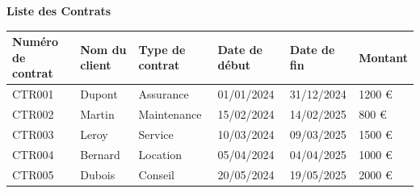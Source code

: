 \documentclass{article}
\begin{document}
\begin{center}
\end{center}

\begin{center}
    \Large\textbf{Liste des Contrats}
\end{center}

\bigskip

\noindent
\begin{tabularx}{\textwidth}{|l|l|l|l|l|X|}
    \hline
    \textbf{Numéro de contrat} & \textbf{Nom du client} & \textbf{Type de contrat} & \textbf{Date de début} & \textbf{Date de fin} & \textbf{Montant} \\
    \hline
    CTR001 & Dupont & Assurance & 01/01/2024 & 31/12/2024 & 1200 € \\
    \hline
    CTR002 & Martin & Maintenance & 15/02/2024 & 14/02/2025 & 800 € \\
    \hline
    CTR003 & Leroy & Service & 10/03/2024 & 09/03/2025 & 1500 € \\
    \hline
    CTR004 & Bernard & Location & 05/04/2024 & 04/04/2025 & 1000 € \\
    \hline
    CTR005 & Dubois & Conseil & 20/05/2024 & 19/05/2025 & 2000 € \\
    \hline
\end{tabularx}
\end{document}
